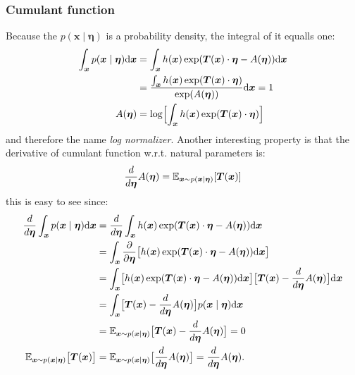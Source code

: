 \subsubsection{Cumulant function}
Because the $p(\boldsymbol{x}\mid \boldsymbol{\eta})$ is a probability density, the integral of it equalls one:
\begin{align}
    \int_{\boldsymbol{x}} p(\boldsymbol{x}\mid \boldsymbol{\eta}) \mbox{\rm d}\boldsymbol{x} &= \int_{\boldsymbol{x}} h(\boldsymbol{x}) \exp( \boldsymbol{T}(\boldsymbol{x}) \cdot \boldsymbol{\eta} - A(\boldsymbol{\eta})) \mbox{\rm d}\boldsymbol{x} \notag  \\
    &=  \frac{ \int_{\boldsymbol{x}}  h(\boldsymbol{x})\exp( \boldsymbol{T}(\boldsymbol{x}) \cdot \boldsymbol{\eta})}{\exp(A(\boldsymbol{\eta}))}  \mbox{\rm d}\boldsymbol{x} = 1  \notag\\
    A(\boldsymbol{\eta}) &= \log\Bigl[ \int_{\boldsymbol{x}} h(\boldsymbol{x})\exp( \boldsymbol{T}(\boldsymbol{x}) \cdot \boldsymbol{\eta})\Bigr] \label{eq:log_norm}
\end{align}
and therefore the name \textit{log normalizer}. Another interesting property is that the derivative of cumulant function w.r.t. natural parameters is:
$$
\frac{d}{d \boldsymbol{\eta}} A(\boldsymbol{\eta}) = \operatorname{\mathbb{E}}_{\boldsymbol{x} \sim p(\boldsymbol{x}\mid \boldsymbol{\eta})} [\boldsymbol{T}(\boldsymbol{x})]
$$
this is easy to see since:
\begin{align*}
    \frac{d}{d \boldsymbol{\eta}} \int_{\boldsymbol{x}} p(\boldsymbol{x}\mid \boldsymbol{\eta}) \mbox{\rm d}\boldsymbol{x}&= \frac{d}{d \boldsymbol{\eta}}   \int_{\boldsymbol{x}} h(\boldsymbol{x}) \exp( \boldsymbol{T}(\boldsymbol{x}) \cdot \boldsymbol{\eta} - A(\boldsymbol{\eta})) \mbox{\rm d}\boldsymbol{x} \\
    &=\int_{\boldsymbol{x}}  \frac{\partial}{\partial \boldsymbol{\eta}} \bigl[h(\boldsymbol{x}) \exp( \boldsymbol{T}(\boldsymbol{x}) \cdot \boldsymbol{\eta} - A(\boldsymbol{\eta})) \mbox{\rm d}\boldsymbol{x} \bigr]  \\
    &=\int_{\boldsymbol{x}}  \bigl[h(\boldsymbol{x}) \exp( \boldsymbol{T}(\boldsymbol{x}) \cdot \boldsymbol{\eta} - A(\boldsymbol{\eta})) \mbox{\rm d}\boldsymbol{x} \bigr] \bigl[ \boldsymbol{T}(\boldsymbol{x}) - \frac{d}{d\boldsymbol{\eta}} A(\boldsymbol{\eta}) \bigr]\mbox{\rm d}\boldsymbol{x} \\
    &=\int_{\boldsymbol{x}}  \bigl[\boldsymbol{T}(\boldsymbol{x}) - \frac{d}{d\boldsymbol{\eta}} A(\boldsymbol{\eta})\bigr] p(\boldsymbol{x}\mid \boldsymbol{\eta}) \mbox{\rm d}\boldsymbol{x}  \\
    &=\operatorname{\mathbb{E}}_{\boldsymbol{x} \sim p(\boldsymbol{x}\mid \boldsymbol{\eta})}\bigl[\boldsymbol{T}(\boldsymbol{x}) - \frac{d}{d\boldsymbol{\eta}} A(\boldsymbol{\eta}) \bigr] = 0 \\
    \operatorname{\mathbb{E}}_{\boldsymbol{x} \sim p(\boldsymbol{x}\mid \boldsymbol{\eta})}\bigl[\boldsymbol{T}(\boldsymbol{x})\bigr] &= \operatorname{\mathbb{E}}_{\boldsymbol{x} \sim p(\boldsymbol{x}\mid \boldsymbol{\eta})} \bigl[\frac{d}{d\boldsymbol{\eta}} A(\boldsymbol{\eta}) \bigr] = \frac{d}{d\boldsymbol{\eta}} A(\boldsymbol{\eta}).
\end{align*}

